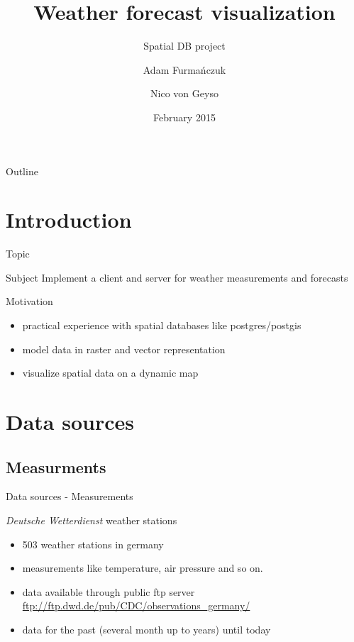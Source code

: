 \documentclass[ucs,9pt]{beamer}
\title[Short Paper Title] %
{Weather forecast visualization}
\subtitle
{Spatial DB project}
\author[Author, Another] %
{Adam Furmańczuk \and Nico von Geyso}
\institute[FU Berlin] %
{Freie Universität Berlin}
\date[CFP 2003] %
{February 2015}
\begin{document}
\begin{frame}[plain]
  \titlepage
\end{frame}

\begin{frame}{Outline}
  \tableofcontents
\end{frame}

\section{Introduction}

\begin{frame}{Topic}
  \begin{block}{Subject}
    Implement a client and server for weather measurements and forecasts
  \end{block}

  \begin{block}{Motivation}
    \begin{itemize}
      \item practical experience with spatial databases like postgres/postgis
      \item model data in raster and vector representation
      \item visualize spatial data on a dynamic map
    \end{itemize}
  \end{block}
\end{frame}

\section{Data sources}
\subsection{Measurments}
\begin{frame}{Data sources - Measurements}
  \begin{block}{\textit{Deutsche Wetterdienst} weather stations}
    \begin{itemize}
        \item 503 weather stations in germany
        \item measurements like temperature, air pressure and so on.
        \item data available through public ftp server \\
          \vspace{0.1cm}
          \url{ftp://ftp.dwd.de/pub/CDC/observations_germany/}
        \item data for the past (several month up to years) until today
    \end{itemize}
  \end{block}
\end{frame}
\end{document}
